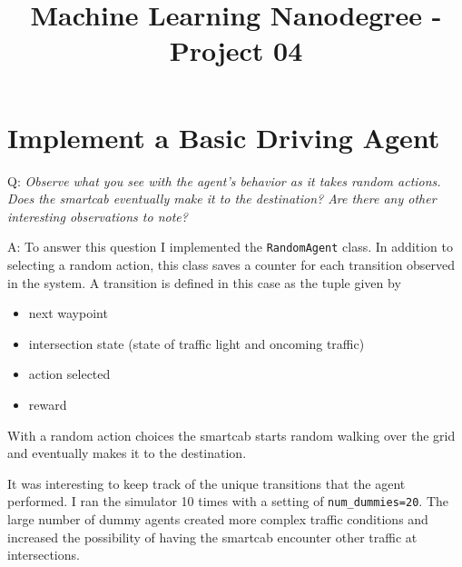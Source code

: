 \documentclass[conference]{IEEEtran}
\begin{document}
%
\title{Machine Learning Nanodegree - Project 04}


\author{
}

\maketitle






\IEEEpeerreviewmaketitle

\section{Implement a Basic Driving Agent}

\vspace{1em}
\noindent Q: \textit{Observe what you see with the agent's behavior as it takes
random actions.  Does the smartcab eventually make it to the destination? Are
there any other interesting observations to note?}

\vspace{2em} \noindent A: To answer this question I implemented the
\verb"RandomAgent" class.  In addition to selecting a random action, this class
saves a counter for each transition observed in the system. A transition is
defined in this case as the tuple given by 

\begin{itemize}
\item next waypoint
\item intersection state (state of traffic light and oncoming traffic)
\item action selected
\item reward
\end{itemize}

With a random action choices the smartcab starts random walking over the grid
and eventually makes it to the destination. 

It was interesting to keep track of the unique transitions that the agent
performed.  I ran the simulator 10 times with a setting of
\verb"num_dummies=20".  The large number of dummy agents created more complex
traffic conditions and increased the possibility of having the smartcab
encounter other traffic at intersections.
\end{document}
